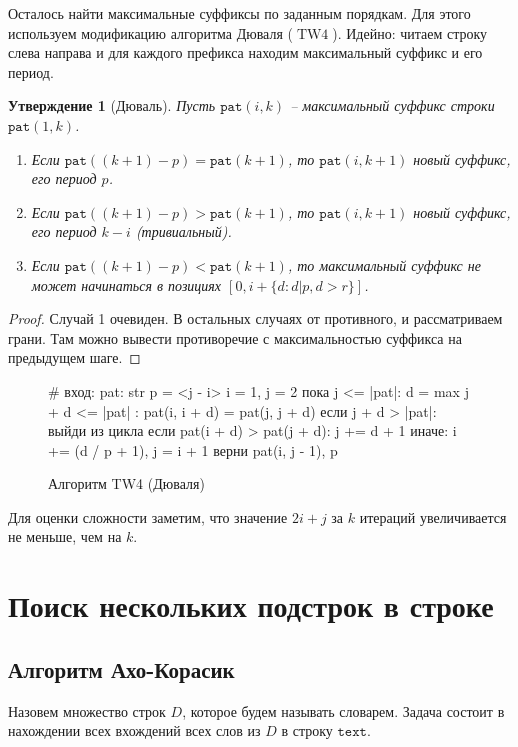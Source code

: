 \documentclass[10pt]{book}
\theoremstyle{plain}
\newtheorem{stm}{Утверждение}[section]
\newcommand{\textm}{\texttt{text}}
\newcommand{\patm}{\texttt{pat}}
\newcommand{\algm}[1]{\operatorname{#1}}
\newenvironment{figurem}[1][]
  {\begin{figure}[p]
  \caption{#1}
  \centering
  }
  {
  \end{figure}
  }
\begin{document}
Осталось найти максимальные суффиксы по заданным порядкам. Для этого используем
модификацию алгоритма Дюваля ($\algm{TW4}$). Идейно: читаем строку слева направа
и для каждого префикса находим максимальный суффикс и его период.

\begin{stm}[Дюваль]
  Пусть $\patm(i,k)$ -- максимальный суффикс строки $\patm(1,k)$.
  \begin{enumerate}
    \item Если $\patm((k+1) - p) = \patm(k+1)$, то $\patm(i,k+1)$ новый суффикс,
      его период $p$.
    \item Если $\patm((k+1) - p) > \patm(k+1)$, то $\patm(i,k+1)$ новый суффикс,
      его период $k - i$ (тривиальный).
    \item Если $\patm((k+1) - p) < \patm(k+1)$, то максимальный суффикс не может
      начинаться в позициях $[0, i + \{d: d|p, d > r \}]$.
  \end{enumerate}
\end{stm}
\begin{proof}
  Случай 1 очевиден. В остальных случаях от противного, и рассматриваем грани.
  Там можно вывести противоречие с максимальностью суффикса на предыдущем шаге.
\end{proof}

\begin{figurem}[Алгоритм TW4 (Дюваля)]
\begin{verbm}
  # вход: pat: str
  p = <j - i>
  i = 1, j = 2
  пока j <= |pat|:
    d = max { j + d <= |pat| : pat(i, i + d) = pat(j, j + d) }
    если j + d > |pat|: выйди из цикла
    если pat(i + d) > pat(j + d): j += d + 1
    иначе: i += (d / p + 1), j = i + 1
  верни pat(i, j - 1), p
\end{verbm}
\end{figurem}

Для оценки сложности заметим, что значение $2i + j$ за $k$ итераций 
увеличивается не меньше, чем на $k$.

\chapter{Поиск нескольких подстрок в строке}

\section{Алгоритм Ахо-Корасик}

Назовем множество строк $D$, которое будем называть словарем. Задача состоит в
нахождении всех вхождений всех слов из $D$ в строку $\textm$.
\end{document}
